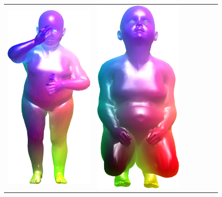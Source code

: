 \begin{figure}[b!]
\begin{tabular}[width=0.8\textwidth]{c|cc|cc|cc|}
		\includegraphics[scale=0.34]{figures/kid18match25.png} &
		\includegraphics[scale=0.3]{figures/kid19_base.png}&

\end{tabular}
\end{figure}
